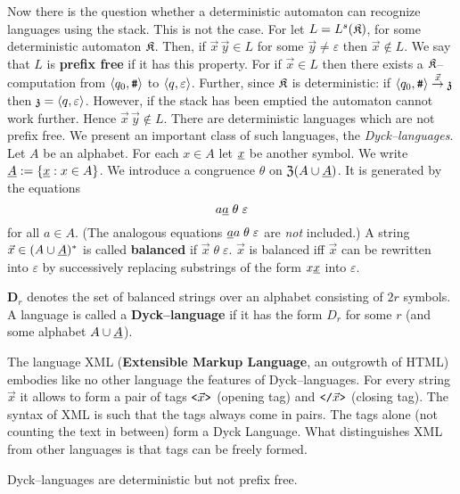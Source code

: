 Now there is the question whether a deterministic automaton
can recognize languages using the stack. This is not the case.
For let $L = L^s(\mathfrak{K})$, for some deterministic automaton $\mathfrak{K}$. 
Then, if $\vec{x}\, \vec{y} \in L$ for some $\vec{y} \neq \varepsilon$ 
then $\vec{x} \not\in L$. We say that $L$ is \textbf{prefix free} 
if it has this property.
For if $\vec{x} \in L$ then there exists a  $\mathfrak{K}$--computation
from $\langle q_0, \mbox{\tt \#}\rangle$ to $\langle q, \varepsilon\rangle$. Further,
since $\mathfrak{K}$ is deterministic: if $\langle q_0,
\mbox{\tt \#}\rangle \stackrel{\vec{x}}{\rightarrow} \mathfrak{z}$ then $\mathfrak{z} = \langle q,
\varepsilon\rangle$. However, if the stack has been emptied
the automaton cannot work further. Hence $\vec{x}\, \vec{y}
\not\in L$. There are deterministic languages which are not
prefix free. We present an important class of such languages,
the {\it Dyck--languages}. Let $A$ be an alphabet. For each $x \in A$ 
let $\underline{x}$ be another symbol. We write $\underline{A} := \{\underline{x} : x \in A\}$.
We introduce a congruence $\theta$ on $\mathfrak{Z}(A \cup \underline{A})$. It is 
generated by the equations
\begin{equation}
a\underline{a}\; \theta\; \varepsilon
\end{equation}
for all $a \in A$.
(The analogous equations $\underline{a}a\; \theta\; \varepsilon$ are
{\it not\/} included.) A string $\vec{x} \in (A \cup \underline{A})^{\ast}$
is called \textbf{balanced} if $\vec{x}\; \theta\; \varepsilon$.
$\vec{x}$ is balanced iff $\vec{x}$ can be rewritten
into $\varepsilon$ by successively replacing substrings of the
form $x\underline{x}$ into $\varepsilon$.
\begin{defn}
$\textbf{D}_r$ denotes the set of balanced strings over
an alphabet consisting of $2r$ symbols.  A language is
called a \textbf{Dyck--language} if it has the form
$D_r$ for some $r$ (and some alphabet $A \cup \underline{A}$).
\end{defn}
The language XML 
(\textbf{Extensible Markup Language}, an outgrowth
of HTML) embodies like no other language the features of
Dyck--languages. For every string $\vec{x}$ it allows to form a pair
of tags $\mbox{\tt <}\vec{x}\mbox{\tt >}$ (opening tag) and
$\mbox{\tt </}\vec{x}\mbox{\tt >}$ (closing tag). The syntax of
XML is such that the tags always come in pairs. The
tags alone (not counting the text in between) form a Dyck Language.
What distinguishes XML from other languages is that tags can be
freely formed.
\begin{prop}
Dyck--languages are deterministic but not prefix free.
\end{prop}
